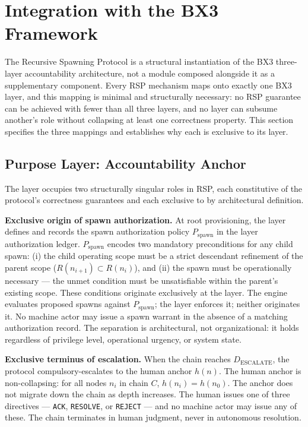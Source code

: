 \section{Integration with the BX3 Framework}
\label{sec:bx3_integration}

The Recursive Spawning Protocol is a structural instantiation of the BX3 three-layer accountability architecture, not a module composed alongside it as a supplementary component. Every RSP mechanism maps onto exactly one BX3 layer, and this mapping is minimal and structurally necessary: no RSP guarantee can be achieved with fewer than all three layers, and no layer can subsume another's role without collapsing at least one correctness property. This section specifies the three mappings and establishes why each is exclusive to its layer.

\subsection{Purpose Layer: Accountability Anchor}
\label{sec:purpose_anchor}

The \purpose{} layer occupies two structurally singular roles in RSP, each constitutive of the protocol's correctness guarantees and each exclusive to \purpose{} by architectural definition.

\medskip
\noindent\textbf{Exclusive origin of spawn authorization.} At root provisioning, the \purpose{} layer defines and records the spawn authorization policy $P_{\mathrm{spawn}}$ in the \fact{} layer authorization ledger. $P_{\mathrm{spawn}}$ encodes two mandatory preconditions for any child spawn: (i) the child operating scope must be a strict descendant refinement of the parent scope ($R(n_{i+1}) \subset R(n_i)$), and (ii) the spawn must be operationally necessary --- the unmet condition must be unsatisfiable within the parent's existing scope. These conditions originate exclusively at the \purpose{} layer. The \bounds{} engine evaluates proposed spawns against $P_{\mathrm{spawn}}$; the \fact{} layer enforces it; neither originates it. No machine actor may issue a spawn warrant in the absence of a matching \purpose{} authorization record. The separation is architectural, not organizational: it holds regardless of privilege level, operational urgency, or system state.

\medskip
\noindent\textbf{Exclusive terminus of escalation.} When the chain reaches $D_{\mathrm{ESCALATE}}$, the protocol compulsory-escalates to the human anchor $h(n)$. The human anchor is non-collapsing: for all nodes $n_i$ in chain $C$, $h(n_i) = h(n_0)$. The anchor does not migrate down the chain as depth increases. The human issues one of three directives --- \texttt{ACK}, \texttt{RESOLVE}, or \texttt{REJECT} --- and no machine actor may issue any of these. The chain terminates in human judgment, never in autonomous resolution.

